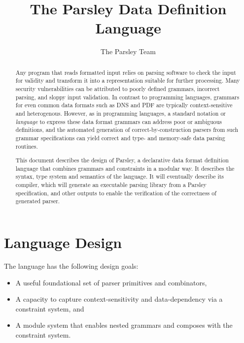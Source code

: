 \documentclass[letterpaper]{article}
\title{The Parsley Data Definition Language}
\author{The Parsley Team}
\begin{document}
\maketitle

\begin{abstract}
  Any program that reads formatted input relies on parsing software to
  check the input for validity and transform it into a representation
  suitable for further processing.  Many security vulnerabilities can
  be attributed to poorly defined grammars, incorrect parsing, and
  sloppy input validation.  In contrast to programming languages,
  grammars for even common data formats such as DNS and PDF are
  typically context-sensitive and heterogenous.  However, as in
  programming languages, a standard notation or {\em language} to
  express these data format grammars can address poor or ambiguous
  definitions, and the automated generation of correct-by-construction
  parsers from such grammar specifications can yield correct and type-
  and memory-safe data parsing routines.

  This document describes the design of Parsley, a declarative data
  format definition language that combines grammars and constraints in
  a modular way.  It describes the syntax, type system and semantics
  of the language.  It will eventually describe its compiler, which
  will generate an executable parsing library from a Parsley
  specification, and other outputs to enable the verification of the
  correctness of generated parser.
\end{abstract}

\section{Language Design}

The language has the following design goals:

\begin{itemize}
\item A useful foundational set of parser primitives and combinators,
\item A capacity to capture context-sensitivity and data-dependency
  via a constraint system, and
\item  A module system that enables nested grammars and composes with
  the constraint system.
\end{itemize}
\end{document}
